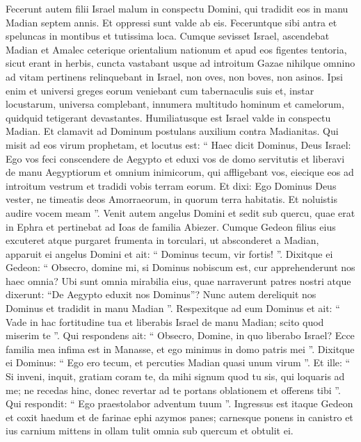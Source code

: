 \begin{biblechapter}
\begin{biblechapter}
\begin{biblechapter}
\begin{biblechapter}
\begin{biblechapter}
\begin{biblechapter}
\verse Fecerunt autem filii Israel malum in conspectu Domini, qui tradidit eos in manu Madian septem annis. 
\verse Et oppressi sunt valde ab eis. Feceruntque sibi antra et speluncas in montibus et tutissima loca. 
\verse Cumque sevisset Israel, ascendebat Madian et Amalec ceterique orientalium nationum 
\verse et apud eos figentes tentoria, sicut erant in herbis, cuncta vastabant usque ad introitum Gazae nihilque omnino ad vitam pertinens relinquebant in Israel, non oves, non boves, non asinos. 
\verse Ipsi enim et universi greges eorum veniebant cum tabernaculis suis et, instar locustarum, universa complebant, innumera multitudo hominum et camelorum, quidquid tetigerant devastantes. 
\verse Humiliatusque est Israel valde in conspectu Madian.
 \verse Et clamavit ad Dominum postulans auxilium contra Madianitas. 
\verse Qui misit ad eos virum prophetam, et locutus est: “ Haec dicit Dominus, Deus Israel: Ego vos feci conscendere de Aegypto et eduxi vos de domo servitutis 
\verse et liberavi de manu Aegyptiorum et omnium inimicorum, qui affligebant vos, eiecique eos ad introitum vestrum et tradidi vobis terram eorum. 
\verse Et dixi: Ego Dominus Deus vester, ne timeatis deos Amorraeorum, in quorum terra habitatis. Et noluistis audire vocem meam ”.
 \verse Venit autem angelus Domini et sedit sub quercu, quae erat in Ephra et pertinebat ad Ioas de familia Abiezer. Cumque Gedeon filius eius excuteret atque purgaret frumenta in torculari, ut absconderet a Madian, 
\verse apparuit ei angelus Domini et ait: “ Dominus tecum, vir fortis! ”. 
\verse Dixitque ei Gedeon: “ Obsecro, domine mi, si Dominus nobiscum est, cur apprehenderunt nos haec omnia? Ubi sunt omnia mirabilia eius, quae narraverunt patres nostri atque dixerunt: “De Aegypto eduxit nos Dominus”? Nunc autem dereliquit nos Dominus et tradidit in manu Madian ”. 
\verse Respexitque ad eum Dominus et ait: “ Vade in hac fortitudine tua et liberabis Israel de manu Madian; scito quod miserim te ”. 
 \verse Qui respondens ait: “ Obsecro, Domine, in quo liberabo Israel? Ecce familia mea infima est in Manasse, et ego minimus in domo patris mei ”. 
\verse Dixitque ei Dominus: “ Ego ero tecum, et percuties Madian quasi unum virum ”. 
\verse Et ille: “ Si inveni, inquit, gratiam coram te, da mihi signum quod tu sis, qui loquaris ad me; 
\verse ne recedas hinc, donec revertar ad te portans oblationem et offerens tibi ”. Qui respondit: “ Ego praestolabor adventum tuum ”.
 \verse Ingressus est itaque Gedeon et coxit haedum et de farinae ephi azymos panes; carnesque ponens in canistro et ius carnium mittens in ollam tulit omnia sub quercum et obtulit ei. 

\end{biblechapter}
\end{biblechapter}
\end{biblechapter}
\end{biblechapter}
\end{biblechapter}
\end{biblechapter}
